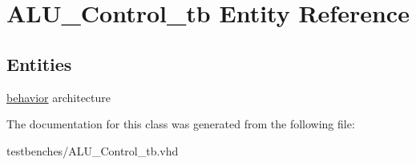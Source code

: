 \hypertarget{class_a_l_u___control__tb}{\section{\-A\-L\-U\-\_\-\-Control\-\_\-tb \-Entity \-Reference}
\label{class_a_l_u___control__tb}
}
\subsection*{\-Entities}
\begin{DoxyCompactItemize}
\item 
\hyperlink{class_a_l_u___control__tb_1_1behavior}{behavior} architecture
\end{DoxyCompactItemize}


\-The documentation for this class was generated from the following file\-:\begin{DoxyCompactItemize}
\item 
testbenches/\-A\-L\-U\-\_\-\-Control\-\_\-tb.\-vhd\end{DoxyCompactItemize}

